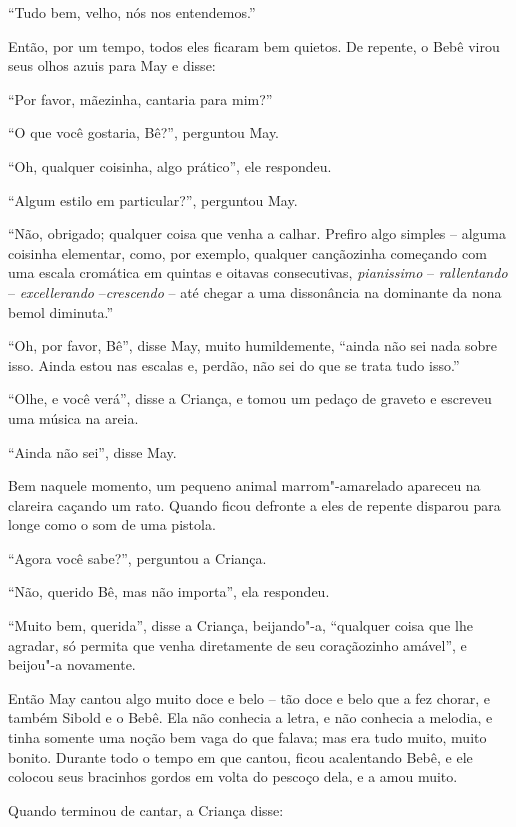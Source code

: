 ``Tudo bem, velho, nós nos entendemos.''

Então, por um tempo, todos eles ficaram bem quietos. De repente, o Bebê
virou seus olhos azuis para May e disse:

``Por favor, mãezinha, cantaria para mim?''

``O que você gostaria, Bê?'', perguntou May.

``Oh, qualquer coisinha, algo prático'', ele respondeu.

``Algum estilo em particular?'', perguntou May.

``Não, obrigado; qualquer coisa que venha a calhar. Prefiro algo simples
-- alguma coisinha elementar, como, por exemplo, qualquer cançãozinha
começando com uma escala cromática em quintas e oitavas consecutivas,
\emph{pianissimo} -- \emph{rallentando} -- \emph{excellerando}
--\emph{crescendo} -- até chegar a uma dissonância na dominante da nona
bemol diminuta.''

``Oh, por favor, Bê'', disse May, muito humildemente, ``ainda não sei
nada sobre isso. Ainda estou nas escalas e, perdão, não sei do que se
trata tudo isso.''

``Olhe, e você verá'', disse a Criança, e tomou um pedaço de graveto e
escreveu uma música na areia.


``Ainda não sei'', disse May.

Bem naquele momento, um pequeno animal marrom"-amarelado apareceu na
clareira caçando um rato. Quando ficou defronte a eles de repente
disparou para longe como o som de uma pistola.

``Agora você sabe?'', perguntou a Criança.

``Não, querido Bê, mas não importa'', ela respondeu.

``Muito bem, querida'', disse a Criança, beijando"-a, ``qualquer coisa
que lhe agradar, só permita que venha diretamente de seu coraçãozinho amável'',
e beijou"-a novamente.

Então May cantou algo muito doce e belo -- tão doce e belo que a fez
chorar, e também Sibold e o Bebê. Ela não conhecia a letra, e não
conhecia a melodia, e tinha somente uma noção bem vaga do que falava;
mas era tudo muito, muito bonito. Durante todo o tempo em que cantou,
ficou acalentando Bebê, e ele colocou seus bracinhos gordos em volta
do pescoço dela, e a amou muito.

Quando terminou de cantar, a Criança disse:

